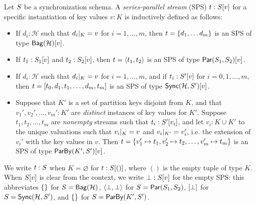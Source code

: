 \begin{definition}
\label{45:def:trace}
Let $\ss$ be a synchronization schema.
A \emph{series-parallel stream} (SPS) $t : \spstype{v}{\ss}$ for a specific instantiation of key values $v : K$ is inductively defined as follows:
\begin{itemize}
\item
If $d_i : \mathcal{H}$ such that $\tuprestrict{d_i}{K} = v$
for $i = 1, \ldots, m$,
then $t = \spsbag{d_1, \ldots d_m}$
is an SPS of type $\spstype{v}{\relleaf{\mathcal{H}}}$.
\item
If $t_1 : \spstype{v}{S_1}$
and $t_2 : \spstype{v}{S_2}$,
then $t = \spspar{t_1}{t_2}$
is an SPS of type $\spstype{v}{\parcomp{S_1}{S_2}}$.
\item
If $d_i : \mathcal{H}$ such that $\tuprestrict{d_i}{K} = v$
for $i = 1, \ldots, m$,
and if $t_i: \spstype{v}{S'}$ for $i = 0, 1, \ldots, m$,
then
$t = \spsseq{t_0, d_1, t_1, \ldots, d_m, t_m}$
is an SPS of type $\spstype{v}{\hier{\mathcal{H}}{S'}}$.
\item
Suppose that $K'$ is a set of partition keys disjoint from $K$,
and that $v_1', v_2', \ldots, v_m': K'$ are \emph{distinct} instances
of key values for $K'$.
Suppose $t_1, t_2, \ldots, t_m$ are \emph{nonempty} streams such that
$t_i: \spstype{v_i}{S'}$,
and let $v_i: K \cup K'$ to the unique valuations
such that $\tuprestrict{v_i}{K} = v$ and $\tuprestrict{v_i}{K'} = v_i'$,
i.e. the extension of $v_i'$ with the key values in $v$.
Then
$t = \spsbag{\keyed{v_1'}{t_1}, \keyed{v_2'}{t_2}, \ldots, \keyed{v_m'}{t_m}}$
is an SPS of type
$\spstype{v}{\keyby{K'}{S'}}$.
\end{itemize}
\end{definition}

We write $t: \ss$ when $K = \varnothing$ for $t: \spstype{()}{\ss}$, where $()$ is the empty tuple of type $K$.
When $\spstype{v}{\ss}$ is clear from the context,
we write $\spsemp: \spstype{v}{\ss}$ for the empty SPS:
this abbreviates $\spsbag{}$ for $\ss = \relleaf{\mathcal{H}}$,
$\spspar{\spsemp}{\spsemp}$ for $\ss = \parcomp{S_1}{S_2}$,
$\spsseq{\bot}$ for $\ss = \hier{\mathcal{H}}{S'}$,
and $\spsbag{}$ for $\ss = \keyby{K'}{S'}$.

